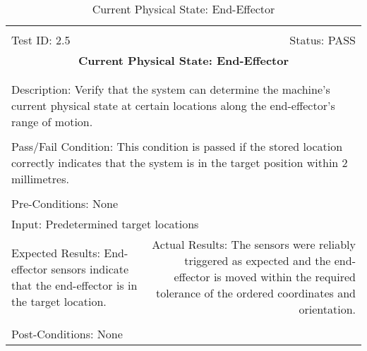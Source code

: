 \documentclass[titlepage]{article}
\begin{document}
\begin{center}
\begin{table}[h!]
\begin{tabular}{|l r|}\hline&\\[-2mm]
	Test ID: 2.5	&Status: PASS\\[-3mm]
	\multicolumn{2}{|c|}{\textbf{\large{Current Physical State: End-Effector}}}\\&\\\hline&\\[-3mm]
	\multicolumn{2}{|p{\textwidth}|}{Description: Verify that the system can determine the machine's current physical state at certain locations along the end-effector's range of motion.}\\[1mm]\hline&\\[-3mm]
	\multicolumn{2}{|p{\textwidth}|}{Pass/Fail Condition: This condition is passed if the stored location correctly indicates that the system is in the target position within 2 millimetres.}\\[1mm]\hline&\\[-3mm]
	\multicolumn{2}{|p{\textwidth}|}{Pre-Conditions: None}\\[4mm]
	\multicolumn{2}{|p{\textwidth}|}{Input: Predetermined target locations}\\[2mm]\hline
	\multicolumn{1}{|p{0.49\textwidth}}{Expected Results: End-effector sensors indicate that the end-effector is in the target location.}	&\multicolumn{1}{|p{0.45\textwidth}|}{Actual Results: The sensors were reliably triggered as expected and the end-effector is moved within the required tolerance of the ordered coordinates and orientation.}\\\hline&\\[-3mm]
	\multicolumn{2}{|p{\textwidth}|}{Post-Conditions: None}\\\hline
\end{tabular}
\caption{Current Physical State: End-Effector}
\end{table}
\end{center}
\newpage
\end{document}
